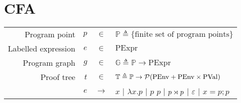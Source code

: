 \documentclass{article}
\begin{document}
\section{CFA}
\begin{center}
  \begin{tabular}{rrcl}
    Program point       & $p$ & $\in$         & $\mathbb{P}\triangleq\{\text{finite set of program points}\}$                              \\
    Labelled expression & $e$ & $\in$         & $\text{PExpr}$                                                                             \\
    Program graph       & $g$ & $\in$         & $\mathbb{G}\triangleq\mathbb{P}\rightarrow\text{PExpr}$                                    \\
    Proof tree          & $t$ & $\in$         & $\mathbb{T}\triangleq\mathbb{P}\rightarrow\mathcal{P}(\text{PEnv}+\text{PEnv}\times\text{PVal})$ \\
                        & $e$ & $\rightarrow$ & $x$ | $\lambda x.p$ | $p$ $p$ | ${p}\rtimes{p}$ | $\varepsilon$ | $x=p;p$
  \end{tabular}
\end{center}
\end{document}
